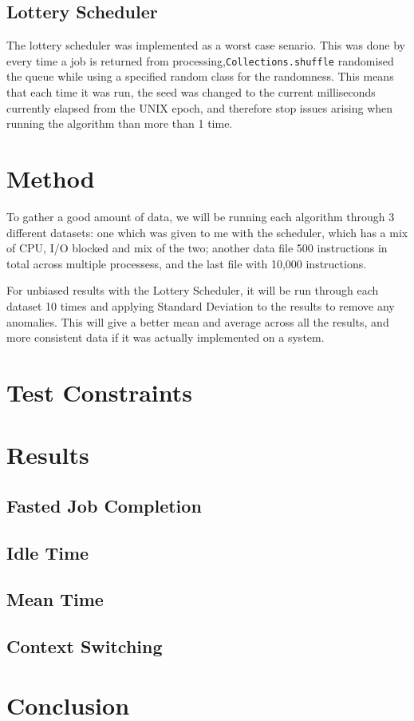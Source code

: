 \documentclass{acm_proc_article-sp}
\begin{document}
\subsection{Lottery Scheduler}

The lottery scheduler was implemented as a worst case senario. This was done by every time a job is returned from processing,\texttt{Collections.shuffle} randomised the queue  while using a specified random class for the randomness. This means that each time it was run, the seed was changed to the current milliseconds currently elapsed from the UNIX epoch, and therefore stop issues arising when running the algorithm than more than 1 time.

\section{Method}

To gather a good amount of data, we will be running each algorithm through 3 different datasets: one which was given to me with the scheduler, which has a mix of CPU, I/O blocked and mix of the two; another data file 500 instructions in total across multiple processess, and the last file with 10,000 instructions. 

For unbiased results with the Lottery Scheduler, it will be run through each dataset 10 times and applying Standard Deviation to the results to remove any anomalies. This will give a better mean and average across all the results, and more consistent data if it was actually implemented on a system.

\section{Test Constraints}

\section{Results}

\subsection{Fasted Job Completion}

\subsection{Idle Time}

\subsection{Mean Time}

\subsection{Context Switching}

\section{Conclusion}
\end{document}
